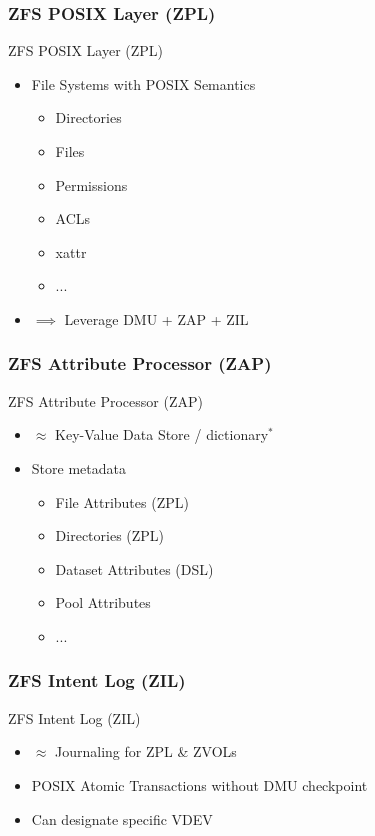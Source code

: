 \subsubsection{ZFS POSIX Layer (ZPL)}
\begin{frame}{ZFS POSIX Layer (ZPL)}
	\begin{itemize}
		\item File Systems with POSIX Semantics
		\pause
		\begin{itemize}
			\item Directories
			\item Files
			\item Permissions
			\item ACLs
			\item xattr
			\item ...
		\end{itemize}
		\pause
		\item $\implies$ Leverage DMU + ZAP + ZIL
	\end{itemize}
\end{frame}

\subsubsection{ZFS Attribute Processor (ZAP)}
\begin{frame}{ZFS Attribute Processor (ZAP)}
	\begin{itemize}
		\item $\approx$ Key-Value Data Store / dictionary$^*$ %
		\item Store metadata
		\begin{itemize}
			\item File Attributes (ZPL)
			\item Directories (ZPL)
			\item Dataset Attributes (DSL)
			\item Pool Attributes
			\item ...
		\end{itemize}
	\end{itemize}
\end{frame}

\subsubsection{ZFS Intent Log (ZIL)}
\begin{frame}{ZFS Intent Log (ZIL)}
\begin{itemize}
	\item $\approx$ Journaling for ZPL \& ZVOLs
	\item POSIX Atomic Transactions without DMU checkpoint %
	\item Can designate specific VDEV %
\end{itemize}
\end{frame}

